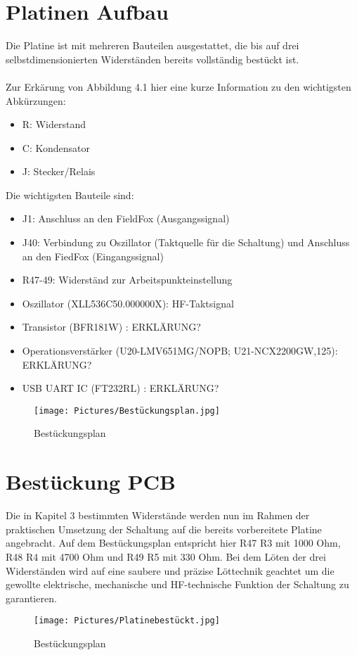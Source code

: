
\section{Platinen Aufbau}
Die Platine ist mit mehreren Bauteilen ausgestattet, die bis auf drei selbstdimensionierten Widerständen
bereits vollständig bestückt ist. \\
\\
Zur Erkärung von Abbildung 4.1 hier eine kurze Information zu den wichtigsten Abkürzungen:
\begin{itemize}
    \item R: Widerstand
    \item C: Kondensator
    \item J: Stecker/Relais

    
\end{itemize}
Die wichtigsten Bauteile sind:
\begin{itemize}
    \item J1: Anschluss an den FieldFox (Ausgangssignal)
    \item J40: Verbindung zu Oszillator (Taktquelle für die Schaltung) und Anschluss an den FiedFox (Eingangssignal)
    \item R47-49: Widerständ zur Arbeitspunkteinstellung
    \item Oszillator (XLL536C50.000000X): HF-Taktsignal
    \item Transistor (BFR181W) : ERKLÄRUNG?
    \item Operationsverstärker (U20-LMV651MG/NOPB; U21-NCX2200GW,125): ERKLÄRUNG?
    \item USB UART IC (FT232RL) : ERKLÄRUNG?
\end{itemize}

\begin{figure}[h]
    \centering
    \texttt{[image: Pictures/Bestückungsplan.jpg]}
    \caption{Bestückungsplan}
\end{figure}



\section{Bestückung PCB}
Die in Kapitel 3 bestimmten Widerstände werden nun im Rahmen der praktischen Umsetzung der Schaltung auf die 
bereits vorbereitete Platine angebracht. Auf dem Bestückungsplan entspricht hier R47 R3 mit 1000 Ohm, R48 R4 mit 
4700 Ohm und R49 R5 mit 330 Ohm. Bei dem Löten der drei Widerständen wird auf eine saubere und präzise Löttechnik
geachtet um die gewollte elektrische, mechanische und HF-technische Funktion der Schaltung zu garantieren. 
\begin{figure}[h]
    \centering
    \texttt{[image: Pictures/Platinebestückt.jpg]}
    \caption{Bestückungsplan}
\end{figure}


